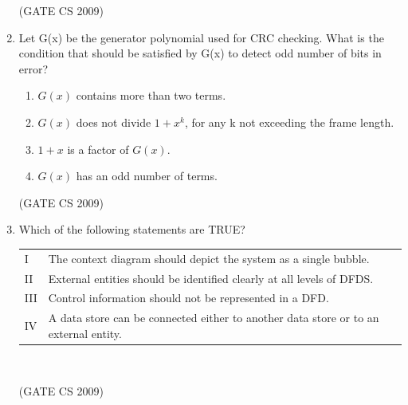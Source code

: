 \documentclass[a4paper, 11pt]{article}
\begin{document}
\begin{enumerate}
    \hfill (GATE CS 2009)

    \item  Let G(x) be the generator polynomial used for CRC checking. What is the condition that should be satisfied by G(x) to detect odd number of bits in error?
    \begin{enumerate} 
        \item $G(x)$ contains more than two terms.
        \item $G(x)$ does not divide $1+x^k$, for any k not exceeding the frame length.
        \item $1+x$ is a factor of $G(x)$.
        \item $G(x)$ has an odd number of terms.
    \end{enumerate}
    
    \hfill (GATE CS 2009)

    \item Which of the following statements are TRUE?\\
    \begin{tabular}{ll}
        I & The context diagram should depict the system as a single bubble. \\
        II & External entities should be identified clearly at all levels of DFDS.\\
        III & Control information should not be represented in a DFD.\\
        IV & A data store can be connected either to another data store or to an external entity.\\
    \end{tabular}\\
    
    \begin{enumerate}
    \end{enumerate}
    
    \hfill (GATE CS 2009)


\end{enumerate}
\end{document}
